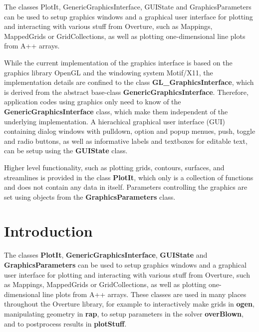 \documentclass{article}
\begin{document}
\vspace{4\baselineskip}

 The classes PlotIt, GenericGraphicsInterface,
GUIState and GraphicsParameters can be used to setup graphics windows
and a graphical user interface for plotting and interacting with
various stuff from Overture, such as Mappings, MappedGrids or
GridCollections, as well as plotting one-dimensional line plots from
A++ arrays.

While the current implementation of the graphics interface is based on
the graphics library OpenGL and the windowing system Motif/X11, the
implementation details are confined to the class {\bf
GL\_GraphicsInterface}, which is derived from the abstract base-class
{\bf GenericGraphicsInterface}. Therefore, application codes using
graphics only need to know of the {\bf GenericGraphicsInterface}
class, which make them independent of the underlying implementation. A
hierachical graphical user interface (GUI) containing dialog windows
with pulldown, option and popup menues, push, toggle and radio
buttons, as well as informative labels and textboxes for editable
text, can be setup using the {\bf GUIState} class.

Higher level functionality, such as plotting grids, contours,
surfaces, and streamlines is provided in the class {\bf PlotIt}, which
only is a collection of functions and does not contain any data in
itself. Parameters controlling the graphics are set using objects from
the {\bf GraphicsParameters} class.

\newpage
\tableofcontents
\listoffigures

\vfill\eject

\section{Introduction}

The classes {\bf PlotIt}, {\bf GenericGraphicsInterface}, {\bf GUIState} and
{\bf GraphicsParameters} can be used to setup graphics windows and a
graphical user interface for plotting and interacting with various
stuff from Overture, such as Mappings, MappedGrids or GridCollections,
as well as plotting one-dimensional line plots from A++ arrays. These
classes are used in many places throughout the Overture library, for
example to interactively make grids in {\bf ogen}, manipulating
geometry in {\bf rap}, to setup parameters in the solver {\bf
overBlown}, and to postprocess results in {\bf plotStuff}.
\end{document}
